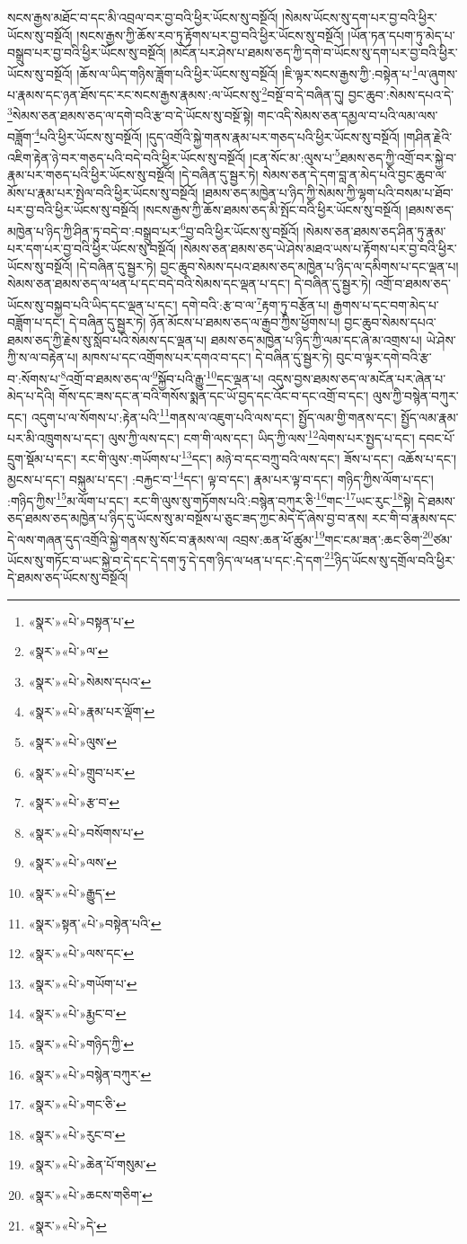 སངས་རྒྱས་མཐོང་བ་དང་མི་འབྲལ་བར་བྱ་བའི་ཕྱིར་ཡོངས་སུ་བསྔོའོ། །སེམས་ཡོངས་སུ་དག་པར་བྱ་བའི་ཕྱིར་ཡོངས་སུ་བསྔོའོ། །སངས་རྒྱས་ཀྱི་ཆོས་རབ་ཏུ་རྟོགས་པར་བྱ་བའི་ཕྱིར་ཡོངས་སུ་བསྔོའོ། །ཡོན་ཏན་དཔག་ཏུ་མེད་པ་བསྒྲུབ་པར་བྱ་བའི་ཕྱིར་ཡོངས་སུ་བསྔོའོ། །མངོན་པར་ཤེས་པ་ཐམས་ཅད་ཀྱི་དགེ་བ་ཡོངས་སུ་དག་པར་བྱ་བའི་ཕྱིར་ཡོངས་སུ་བསྔོའོ། །ཆོས་ལ་ཡིད་གཉིས་ཟློག་པའི་ཕྱིར་ཡོངས་སུ་བསྔོའོ། །ཇི་ལྟར་སངས་རྒྱས་ཀྱི་:བསྟེན་པ་\footnote{«སྣར་»«པེ་»བསྟན་པ་}ལ་ཞུགས་པ་རྣམས་དང་ཉན་ཐོས་དང་རང་སངས་རྒྱས་རྣམས་:ལ་ཡོངས་སུ་\footnote{«སྣར་»«པེ་»ལ་}བསྔོ་བ་དེ་བཞིན་དུ། བྱང་ཆུབ་:སེམས་དཔའ་དེ་\footnote{«སྣར་»«པེ་»སེམས་དཔའ་}སེམས་ཅན་ཐམས་ཅད་ལ་དགེ་བའི་རྩ་བ་དེ་ཡོངས་སུ་བསྔོ་སྟེ། གང་འདི་སེམས་ཅན་དམྱལ་བ་པའི་ལམ་ལས་བཟློག་\footnote{«སྣར་»«པེ་»རྣམ་པར་ལྡོག་}པའི་ཕྱིར་ཡོངས་སུ་བསྔོའོ། །དུད་འགྲོའི་སྐྱེ་གནས་རྣམ་པར་གཅད་པའི་ཕྱིར་ཡོངས་སུ་བསྔོའོ། །གཤིན་རྗེའི་འཇིག་རྟེན་ཉེ་བར་གཅད་པའི་བདེ་བའི་ཕྱིར་ཡོངས་སུ་བསྔོའོ། །ངན་སོང་མ་:ལུས་པ་\footnote{«སྣར་»«པེ་»ལུས་}ཐམས་ཅད་ཀྱི་འགྲོ་བར་སྐྱེ་བ་རྣམ་པར་གཅད་པའི་ཕྱིར་ཡོངས་སུ་བསྔོའོ། །དེ་བཞིན་དུ་སྦྱར་ཏེ། སེམས་ཅན་དེ་དག་བླ་ན་མེད་པའི་བྱང་ཆུབ་ལ་མོས་པ་རྣམ་པར་སྤེལ་བའི་ཕྱིར་ཡོངས་སུ་བསྔོའོ། །ཐམས་ཅད་མཁྱེན་པ་ཉིད་ཀྱི་སེམས་ཀྱི་ལྷག་པའི་བསམ་པ་ཐོབ་པར་བྱ་བའི་ཕྱིར་ཡོངས་སུ་བསྔོའོ། །སངས་རྒྱས་ཀྱི་ཆོས་ཐམས་ཅད་མི་སྤོང་བའི་ཕྱིར་ཡོངས་སུ་བསྔོའོ། །ཐམས་ཅད་མཁྱེན་པ་ཉིད་ཀྱི་ཤིན་ཏུ་བདེ་བ་:བསྒྲུབ་པར་\footnote{«སྣར་»«པེ་»གྲུབ་པར་}བྱ་བའི་ཕྱིར་ཡོངས་སུ་བསྔོའོ། །སེམས་ཅན་ཐམས་ཅད་ཤིན་ཏུ་རྣམ་པར་དག་པར་བྱ་བའི་ཕྱིར་ཡོངས་སུ་བསྔོའོ། །སེམས་ཅན་ཐམས་ཅད་ཡེ་ཤེས་མཐའ་ཡས་པ་རྟོགས་པར་བྱ་བའི་ཕྱིར་ཡོངས་སུ་བསྔོའོ། །དེ་བཞིན་དུ་སྦྱར་ཏེ། བྱང་ཆུབ་སེམས་དཔའ་ཐམས་ཅད་མཁྱེན་པ་ཉིད་ལ་དམིགས་པ་དང་ལྡན་པ། སེམས་ཅན་ཐམས་ཅད་ལ་ཕན་པ་དང་བདེ་བའི་སེམས་དང་ལྡན་པ་དང་། དེ་བཞིན་དུ་སྦྱར་ཏེ། འགྲོ་བ་ཐམས་ཅད་ཡོངས་སུ་བསྐྱབ་པའི་ཡིད་དང་ལྡན་པ་དང་། དགེ་བའི་:རྩ་བ་ལ་\footnote{«སྣར་»«པེ་»རྩ་བ་}རྟག་ཏུ་བརྩོན་པ། རྒྱགས་པ་དང་བག་མེད་པ་བཟློག་པ་དང་། དེ་བཞིན་དུ་སྦྱར་ཏེ། ཉོན་མོངས་པ་ཐམས་ཅད་ལ་རྒྱབ་ཀྱིས་ཕྱོགས་པ། བྱང་ཆུབ་སེམས་དཔའ་ཐམས་ཅད་ཀྱི་རྗེས་སུ་སློབ་པའི་སེམས་དང་ལྡན་པ། ཐམས་ཅད་མཁྱེན་པ་ཉིད་ཀྱི་ལམ་དང་ཞེ་མ་འགྲས་པ། ཡེ་ཤེས་ཀྱི་ས་ལ་བརྟེན་པ། མཁས་པ་དང་འགྲོགས་པར་དགའ་བ་དང་། དེ་བཞིན་དུ་སྦྱར་ཏེ། བུང་བ་ལྟར་དགེ་བའི་རྩ་བ་:སོགས་པ་\footnote{«སྣར་»«པེ་»བསོགས་པ་}འགྲོ་བ་ཐམས་ཅད་ལ་\footnote{«སྣར་»«པེ་»ལས་}སྐྱོབ་པའི་རྒྱུ་\footnote{«སྣར་»«པེ་»རྒྱུད་}དང་ལྡན་པ། འདུས་བྱས་ཐམས་ཅད་ལ་མངོན་པར་ཞེན་པ་མེད་པ་དེའི། གོས་དང་ཟས་དང་ན་བའི་གསོས་སྨན་དང་ཡོ་བྱད་དང་འོང་བ་དང་འགྲོ་བ་དང་། ལུས་ཀྱི་བསྙེན་བཀུར་དང་། འདུག་པ་ལ་སོགས་པ་:རྟེན་པའི་\footnote{«སྣར་»སྟན་«པེ་»བསྟེན་པའི་}གནས་ལ་འཇུག་པའི་ལས་དང་། སྤྱོད་ལམ་གྱི་གནས་དང་། སྤྱོད་ལམ་རྣམ་པར་མི་འཁྲུགས་པ་དང་། ལུས་ཀྱི་ལས་དང་། ངག་གི་ལས་དང་། ཡིད་ཀྱི་ལས་\footnote{«སྣར་»«པེ་»ལས་དང་}ལེགས་པར་སྤྱད་པ་དང་། དབང་པོ་དྲུག་སྡོམ་པ་དང་། རང་གི་ལུས་:གཡོགས་པ་\footnote{«སྣར་»«པེ་»གཡོག་པ་}དང་། མཉེ་བ་དང་བཀྲུ་བའི་ལས་དང་། ཟོས་པ་དང་། འཆོས་པ་དང་། མྱངས་པ་དང་། བསྐུམ་པ་དང་། :བརྐྱང་བ་\footnote{«སྣར་»«པེ་»རྨྱང་བ་}དང་། ལྟ་བ་དང་། རྣམ་པར་ལྟ་བ་དང་། གཉིད་ཀྱིས་ལོག་པ་དང་། :གཉིད་ཀྱིས་\footnote{«སྣར་»«པེ་»གཉིད་ཀྱི་}མ་ལོག་པ་དང་། རང་གི་ལུས་སུ་གཏོགས་པའི་:བསྙེན་བཀུར་ཅི་\footnote{«སྣར་»«པེ་»བསྙེན་བཀུར་}གང་\footnote{«སྣར་»«པེ་»གང་ཅི་}ཡང་རུང་\footnote{«སྣར་»«པེ་»རུང་བ་}སྟེ། དེ་ཐམས་ཅད་ཐམས་ཅད་མཁྱེན་པ་ཉིད་དུ་ཡོངས་སུ་མ་བསྔོས་པ་ཅུང་ཟད་ཀྱང་མེད་དོ་ཞེས་བྱ་བ་ནས། རང་གི་བ་རྣམས་དང་དེ་ལས་གཞན་དུད་འགྲོའི་སྐྱེ་གནས་སུ་སོང་བ་རྣམས་ལ། འབྲས་:ཆན་ཕོ་ཚུམ་\footnote{«སྣར་»«པེ་»ཆེན་པོ་གསུམ་}གང་ངམ་ཟན་:ཆང་ཅིག་\footnote{«སྣར་»«པེ་»ཆངས་གཅིག་}ཙམ་ཡོངས་སུ་གཏོང་བ་ཡང་སྐྱེ་བ་དེ་དང་དེ་དག་ཏུ་དེ་དག་ཉིད་ལ་ཕན་པ་དང་:དེ་དག་\footnote{«སྣར་»«པེ་»དེ་}ཉིད་ཡོངས་སུ་དགྲོལ་བའི་ཕྱིར་དེ་ཐམས་ཅད་ཡོངས་སུ་བསྔོའོ། 